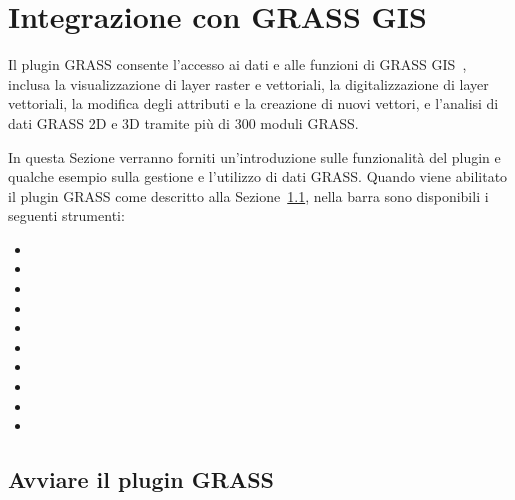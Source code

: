 
\section{Integrazione con GRASS GIS}\label{sec:grass}


Il plugin GRASS consente l'accesso ai dati e alle funzioni di GRASS
GIS~\cite{GRASSweb}, inclusa la visualizzazione di layer raster e vettoriali,
la digitalizzazione di layer vettoriali, la modifica degli attributi e la
creazione di nuovi vettori, e l'analisi di dati GRASS 2D e 3D tramite più di
300 moduli GRASS.

In questa Sezione verranno forniti un'introduzione sulle funzionalità del plugin
e qualche esempio sulla gestione e l'utilizzo di dati GRASS. Quando viene
abilitato il plugin GRASS come descritto alla Sezione~\ref{sec:starting_grass},
nella barra sono disponibili i seguenti strumenti:
 
\begin{itemize}
\item {}
\item {}
\item {}
\item {}
\item {}
\item {}
\item {}
\item {}
\item {} 
\item {}
\end{itemize}

\subsection{Avviare il plugin GRASS}\label{sec:starting_grass}

